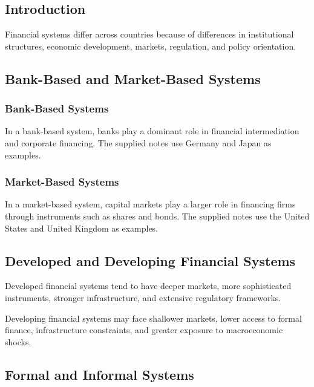 \documentclass[
]{article}
\begin{document}
\subsection{Introduction}\label{introduction-4}

Financial systems differ across countries because of differences in institutional structures, economic development, markets, regulation, and policy orientation.

\subsection{Bank-Based and Market-Based Systems}\label{bank-based-and-market-based-systems}

\subsubsection{Bank-Based Systems}\label{bank-based-systems}

In a bank-based system, banks play a dominant role in financial intermediation and corporate financing. The supplied notes use Germany and Japan as examples.

\subsubsection{Market-Based Systems}\label{market-based-systems}

In a market-based system, capital markets play a larger role in financing firms through instruments such as shares and bonds. The supplied notes use the United States and United Kingdom as examples.

\subsection{Developed and Developing Financial Systems}\label{developed-and-developing-financial-systems}

Developed financial systems tend to have deeper markets, more sophisticated instruments, stronger infrastructure, and extensive regulatory frameworks.

Developing financial systems may face shallower markets, lower access to formal finance, infrastructure constraints, and greater exposure to macroeconomic shocks.

\subsection{Formal and Informal Systems}\label{formal-and-informal-systems}
\end{document}

